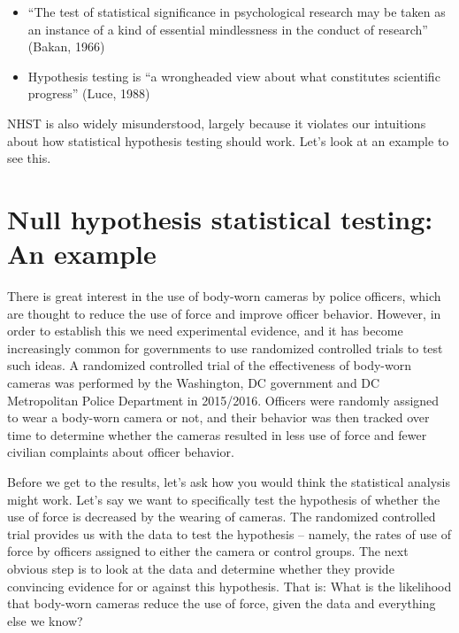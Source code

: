 \documentclass[12pt,]{book}
\providecommand{\tightlist}{%
  \setlength{\itemsep}{0pt}\setlength{\parskip}{0pt}}
\theoremstyle{definition}
\theoremstyle{definition}
\theoremstyle{definition}
\theoremstyle{remark}
\begin{document}
\begin{itemize}
\tightlist
\item
  ``The test of statistical significance in psychological research may be taken as an instance of a kind of essential mindlessness in the conduct of research'' (Bakan, 1966)
\item
  Hypothesis testing is ``a wrongheaded view about what constitutes scientific progress'' (Luce, 1988)
\end{itemize}

NHST is also widely misunderstood, largely because it violates our intuitions about how statistical hypothesis testing should work. Let's look at an example to see this.

\hypertarget{null-hypothesis-statistical-testing-an-example}{%
\section{Null hypothesis statistical testing: An example}\label{null-hypothesis-statistical-testing-an-example}}

There is great interest in the use of body-worn cameras by police officers, which are thought to reduce the use of force and improve officer behavior. However, in order to establish this we need experimental evidence, and it has become increasingly common for governments to use randomized controlled trials to test such ideas. A randomized controlled trial of the effectiveness of body-worn cameras was performed by the Washington, DC government and DC Metropolitan Police Department in 2015/2016. Officers were randomly assigned to wear a body-worn camera or not, and their behavior was then tracked over time to determine whether the cameras resulted in less use of force and fewer civilian complaints about officer behavior.

Before we get to the results, let's ask how you would think the statistical analysis might work. Let's say we want to specifically test the hypothesis of whether the use of force is decreased by the wearing of cameras. The randomized controlled trial provides us with the data to test the hypothesis -- namely, the rates of use of force by officers assigned to either the camera or control groups. The next obvious step is to look at the data and determine whether they provide convincing evidence for or against this hypothesis. That is: What is the likelihood that body-worn cameras reduce the use of force, given the data and everything else we know?
\end{document}
